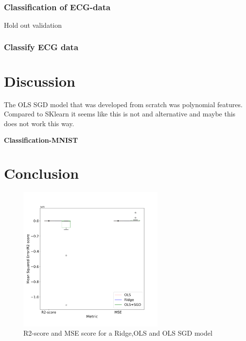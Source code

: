 \documentclass[twocolumn]{cinc}
\begin{document}
\subsubsection{Classification of ECG-data}



Hold out validation

\subsubsection{Classify ECG data}

\section{Discussion}
The OLS SGD model that was developed from scratch was polynomial features. Compared to SKlearn it seems like this is not and alternative and maybe this does not work this way.


\textbf{Classification-MNIST}


\section{Conclusion}



\onecolumn
\appendix

\begin{figure}[htbp!]
\centering
\includegraphics[width=0.65\textwidth]{Figures/boxplot_OLS_ridge_sgd.png}
\caption{R2-score and MSE score for a Ridge,OLS and OLS SGD model}
\label{fig:appendix_sdg}
\end{figure}
\end{document}
